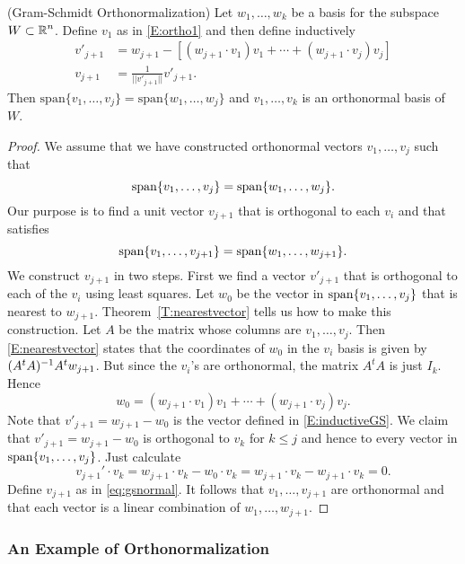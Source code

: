 \documentclass{ximera}
\begin{document}
\begin{theorem} (Gram-Schmidt Orthonormalization) \label{T:orthobasis}
Let $w_1,\ldots,w_k$ be a basis for the subspace $W\subset\mbox{$\Bbb{R}$}^n$.  Define
$v_1$ as in \eqref{E:ortho1} and then define inductively
\begin{align}
  v'_{j+1} & =  w_{j+1} -[(w_{j+1}\cdot v_1)v_1+ \cdots  +(w_{j+1}\cdot v_j)v_j] \label{E:inductiveGS} \\
v_{j+1} & =  \frac{1}{||v'_{j+1}||}v'_{j+1}. \label{eq:gsnormal}
\end{align}
Then $\mathrm{span}\{v_1,\ldots,v_j\}=\mathrm{span}\{w_1,\ldots,w_j\}$ 
and $v_1,\ldots,v_k$ is an orthonormal basis of $W$. 
\end{theorem}

\begin{proof}  We assume that we have constructed orthonormal vectors $v_1,\ldots,v_j$
such that
\[
{\rm span}\{v_1,\ldots,v_j\} = {\rm span}\{w_1,\ldots,w_j\}.
\]
Our purpose is to find a unit vector $v_{j+1}$ that is orthogonal to each $v_i$
and that satisfies
\[
{\rm span}\{v_1,\ldots,v_{j+1}\} = {\rm span}\{w_1,\ldots,w_{j+1}\}.
\]
We construct $v_{j+1}$ in two steps.  First we find a vector $v'_{j+1}$
that is orthogonal to each of the $v_i$ using least squares.  Let $w_0$
be the vector in ${\rm span}\{v_1,\ldots,v_j\}$ that is nearest to $w_{j+1}$.
Theorem~\ref{T:nearestvector} tells us how to make this construction.
Let $A$ be the matrix whose columns are $v_1,\ldots,v_j$.  Then
\eqref{E:nearestvector} states that the coordinates of $w_0$ in the $v_i$ basis
is given by $(A^tA)^{-1} A^tw_{j+1}$. But since the $v_i$'s are orthonormal,
the matrix $A^tA$ is just $I_k$.  Hence
\[
w_0 =  (w_{j+1}\cdot v_1)v_1 + \cdots + (w_{j+1}\cdot v_j)v_j.
\]
Note that $v'_{j+1}=w_{j+1}-w_0$ is the vector defined in \eqref{E:inductiveGS}.
We claim that $v'_{j+1}=w_{j+1}-w_0$ is orthogonal to $v_k$ for $k\leq j$
and hence to every vector in ${\rm span}\{v_1,\ldots,v_j\}$.  Just calculate
\[
v_{j+1}'\cdot v_k = w_{j+1}\cdot v_k - w_0\cdot v_k =
w_{j+1}\cdot v_k -  w_{j+1}\cdot v_k = 0.
\]
Define $v_{j+1}$ as in
\eqref{eq:gsnormal}.  It follows that $v_1,\ldots,v_{j+1}$ are orthonormal and
that each vector is a linear combination of $w_1,\ldots,w_{j+1}$.  \end{proof}


\subsubsection*{An Example of Orthonormalization}
\end{document}
